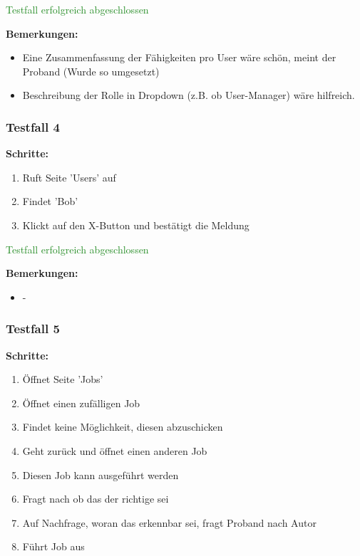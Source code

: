 {\textcolor{ForestGreen}{Testfall erfolgreich abgeschlossen}

\bigskip
\textbf{Bemerkungen:}

\begin{itemize}[noitemsep,nolistsep]
    \item Eine Zusammenfassung der Fähigkeiten pro User wäre schön, meint der Proband (Wurde so umgesetzt)
    \item Beschreibung der Rolle in Dropdown (z.B. ob User-Manager) wäre hilfreich.
\end{itemize}


\subsubsection*{Testfall 4}

\textbf{Schritte:}

\begin{enumerate}
    \item Ruft Seite 'Users' auf
    \item Findet 'Bob'
    \item Klickt auf den X-Button und bestätigt die Meldung
\end{enumerate}

\textcolor{ForestGreen}{Testfall erfolgreich abgeschlossen}

\bigskip
\textbf{Bemerkungen:}

\begin{itemize}[noitemsep,nolistsep]
    \item -
\end{itemize}

\subsubsection*{Testfall 5}

\textbf{Schritte:}

\begin{enumerate}
    \item Öffnet Seite 'Jobs'
    \item Öffnet einen zufälligen Job
    \item Findet keine Möglichkeit, diesen abzuschicken
    \item Geht zurück und öffnet einen anderen Job
    \item Diesen Job kann ausgeführt werden
    \item Fragt nach ob das der richtige sei
    \item Auf Nachfrage, woran das erkennbar sei, fragt Proband nach Autor
    \item Führt Job aus
\end{enumerate}

}
